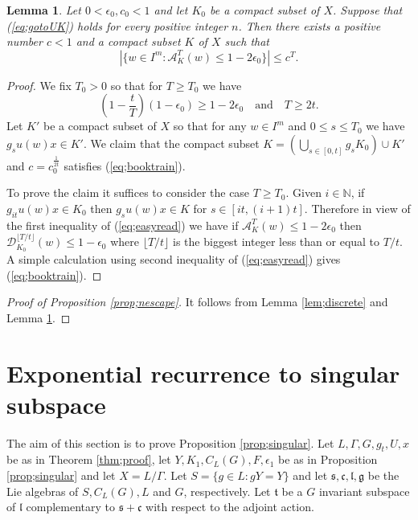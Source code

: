 \documentclass[12pt]{amsart}
\newtheorem{lem}[thm]{Lemma}
\theoremstyle{definition}
\theoremstyle{remark}
\numberwithin{equation}{section}
\begin{document}
\begin{lem}\label{lem;continuousd}
Let $0< \epsilon_0,  c_0<1$  and let ${K_0}$ be a compact subset of $X$. Suppose that 
(\ref{eq;gotoUK}) holds for every positive integer $n$.
Then there exists a positive number  $ c<1$ and a compact subset $ K$ of $X$ such that 
\begin{equation}\label{eq;booktrain}
\left |\{w\in I^m: \mathcal A_{ K}^T(w)\le 1- 2\epsilon_0   \}\right |\le   c^T.
\end{equation}
\end{lem}
\begin{proof}
We fix $T_0>0$ so that for $T\ge T_0$ we have 
\begin{equation}\label{eq;easyread}
\left(1-\frac{t}{T}\right)\left(1-{\epsilon_0}\right)\ge 1-2\epsilon_0 \quad
\mbox{and}\quad T\ge  2t.
\end{equation}
Let $K'$ be a compact subset of $X$ so that 
 for any $w\in I^m$ and $0\le s\le T_0$ we have $g_{s}u(w)x\in K'$. 
 We claim that the compact subset 
    $ K=\left (\bigcup_{s\in [0,t]}g_sK_0\right) \cup K'$ and $ c=c_0^{\frac{1}{2t}}$ satisfies (\ref{eq;booktrain}).
 
 To prove  the claim it suffices to consider the case $T\ge T_0$. 
 Given $i\in \mathbb N$,
 if
 $g_{it}u(w)x\in  K_0 $ then $g_su(w)x\in K$ for $s\in [it, (i+1)t]$. Therefore  in view of
 the first inequality of  (\ref{eq;easyread}) we have if
  $\mathcal A_{ K}^T(w)\le 1-2\epsilon_0$ then $\mathcal D_{K_0}^{\lfloor T/t\rfloor}(w)\le 1-{\epsilon_0}$ 
 where ${\lfloor T/t\rfloor} $ is the biggest  integer less  than or equal to $T/t$.
 A simple calculation using 
 second inequality of (\ref{eq;easyread}) gives (\ref{eq;booktrain}).
\end{proof}

\begin{proof}[Proof of Proposition \ref{prop;nescape}]
It follows from  Lemma \ref{lem;discrete} and Lemma  \ref{lem;continuousd}.
\end{proof}

\section{Exponential recurrence to  singular subspace}
The aim of this section is to prove Proposition \ref{prop;singular}. 
Let $L, \Gamma, G, g_t, U,x$ be   as  in Theorem \ref{thm;proof}, let $Y, K_1 , C_L(G), F,\epsilon_1$ be
 as in Proposition \ref{prop;singular} and let $X=L/\Gamma$.
Let $S=\{g\in L: gY=Y\}$ and  let
 $\mathfrak s, \mathfrak c,\mathfrak l, \mathfrak g$ be the Lie algebras of $S,C_L(G), L$ and  $G$, respectively.
Let $\mathfrak t$ be  a $ G $ invariant subspace of $\mathfrak l$ complementary to 
$\mathfrak s+\mathfrak c$ with respect to the adjoint action.
\end{document}
